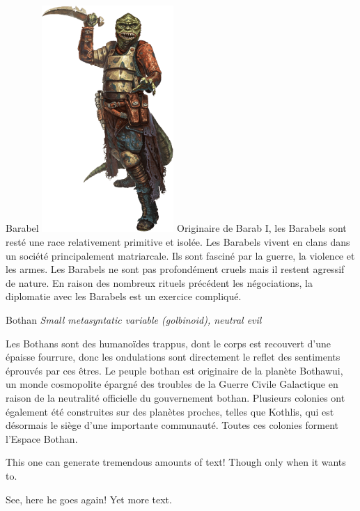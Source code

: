 \begin{monsterbox}{Barabel}
	\textit{\includegraphics[width=5cm]{img/races/barabel.png}}
	\hline
	\basics[%
		type = Reptile,
		planet = Barab I,
		language = Barabel
	]
	\hline
	\traits
	\stats
	\hline
	Originaire de Barab I, les Barabels sont resté une race relativement primitive et isolée. Les Barabels vivent en clans dans un société principalement matriarcale. Ils sont fasciné par la guerre, la violence et les armes. Les Barabels ne sont pas profondément cruels mais il restent agressif de nature. En raison des nombreux rituels précédent les négociations, la diplomatie avec les Barabels est un exercice compliqué.
\end{monsterbox}

\begin{monsterbox}{Bothan}
	\textit{Small metasyntatic variable (golbinoid), neutral evil}\\
	\hline
	\basics[%
	type = Félin,
	planet = Bothawui,
	language = Bothese
	]
	\hline
	\traits[
    AGI = \stat{8} %
	]
	\stats[
    RES = 0 %
	]

	\hline
	
	\details[%
	size = 1m50
	]
	\hline 
	Les Bothans sont des humanoïdes trappus, dont le corps est recouvert d'une épaisse fourrure, donc les ondulations sont directement le reflet des sentiments éprouvés par ces êtres. 
  	Le peuple bothan est originaire de la planète Bothawui, un monde cosmopolite épargné des troubles de la Guerre Civile Galactique en raison de la neutralité officielle du gouvernement bothan. Plusieurs colonies ont également été construites sur des planètes proches, telles que Kothlis, qui est désormais le siège d'une importante communauté. Toutes ces colonies forment l'Espace Bothan. 
	\begin{monsteraction}
		This one can generate tremendous amounts of text! Though only when it wants to.
	\end{monsteraction}

	\begin{monsteraction}
    See, here he goes again! Yet more text.
	\end{monsteraction}
\end{monsterbox}

